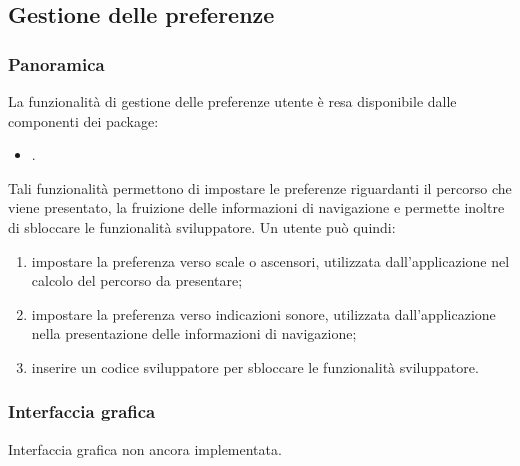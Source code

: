 \documentclass[../Funzionalita.tex]{subfiles}
\begin{document}
\subsection{Gestione delle preferenze}
\label{subsec:GestionePreferenze}

		\subsubsection{Panoramica}
			La funzionalità di gestione delle preferenze utente è resa disponibile dalle componenti dei package:
			\begin{itemize}
				\item \usersetting.
			\end{itemize}
			Tali funzionalità permettono di impostare le preferenze riguardanti il percorso che viene presentato, la fruizione delle informazioni di navigazione e permette inoltre di sbloccare le funzionalità sviluppatore.
			Un utente può quindi:
			\begin{enumerate}
				\item impostare la preferenza verso scale o ascensori, utilizzata dall'applicazione nel calcolo del percorso da presentare;
				\item impostare la preferenza verso indicazioni sonore, utilizzata dall'applicazione nella presentazione delle informazioni di navigazione;
				\item inserire un codice sviluppatore per sbloccare le funzionalità sviluppatore.
			\end{enumerate}
			
		\newpage
		\subsubsection{Interfaccia grafica}
			Interfaccia grafica non ancora implementata.
			
				
				
\end{document}

